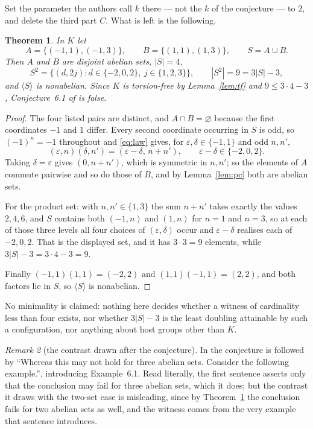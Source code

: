 \documentclass[11pt]{amsart}
\newtheorem{theorem}{Theorem}
\theoremstyle{remark}
\newtheorem{remark}[theorem]{Remark}
\newcommand{\K}{K}
\begin{document}
\noindent
Set the parameter the authors call $k$ there --- not the $k$ of the conjecture
--- to $2$, and delete the third part $C$. What is left is the following.

\begin{theorem}\label{thm:main}
In $\K$ let
\[
  A=\{(-1,1),(-1,3)\},\qquad B=\{(1,1),(1,3)\},\qquad S=A\cup B .
\]
Then $A$ and $B$ are disjoint abelian sets, $|S|=4$,
\[
  S^{2}=\bigl\{(d,2j):d\in\{-2,0,2\},\ j\in\{1,2,3\}\bigr\},
  \qquad |S^{2}|=9=3|S|-3,
\]
and $\langle S\rangle$ is nonabelian. Since $\K$ is torsion-free by
Lemma~\ref{lem:tf} and $9\le3\cdot4-3$, Conjecture~6.1 of \cite{MN} is false.
\end{theorem}

\begin{proof}
The four listed pairs are distinct, and $A\cap B=\varnothing$ because the first
coordinates $-1$ and $1$ differ. Every second coordinate occurring in $S$ is
odd, so $(-1)^{n}=-1$ throughout and \eqref{eq:law} gives, for
$\varepsilon,\delta\in\{-1,1\}$ and odd $n,n'$,
\[
  (\varepsilon,n)(\delta,n')=(\varepsilon-\delta,\,n+n'),
  \qquad \varepsilon-\delta\in\{-2,0,2\}.
\]
Taking $\delta=\varepsilon$ gives $(0,n+n')$, which is symmetric in $n,n'$; so
the elements of $A$ commute pairwise and so do those of $B$, and by
Lemma~\ref{lem:pc} both are abelian sets.

For the product set: with $n,n'\in\{1,3\}$ the sum $n+n'$ takes exactly the
values $2,4,6$, and $S$ contains both $(-1,n)$ and $(1,n)$ for $n=1$ and
$n=3$, so at each of those three levels all four choices of
$(\varepsilon,\delta)$ occur and $\varepsilon-\delta$ realises each of
$-2,0,2$. That is the displayed set, and it has $3\cdot3=9$ elements, while
$3|S|-3=3\cdot4-3=9$.

Finally $(-1,1)(1,1)=(-2,2)$ and $(1,1)(-1,1)=(2,2)$, and both factors lie in
$S$, so $\langle S\rangle$ is nonabelian.
\end{proof}

\noindent
No minimality is claimed: nothing here decides whether a witness of
cardinality less than four exists, nor whether $3|S|-3$ is the least doubling
attainable by such a configuration, nor anything about host groups other than
$\K$.

\begin{remark}[the contrast drawn after the conjecture]
In \cite{MN} the conjecture is followed by ``Whereas this may not hold for
three abelian sets. Consider the following example.'', introducing Example~6.1.
Read literally, the first sentence asserts only that the conclusion may fail
for three abelian sets, which it does; but the contrast it draws with the
two-set case is misleading, since by Theorem~\ref{thm:main} the conclusion
fails for two abelian sets as well, and the witness comes from the very example
that sentence introduces.
\end{remark}
\end{document}
